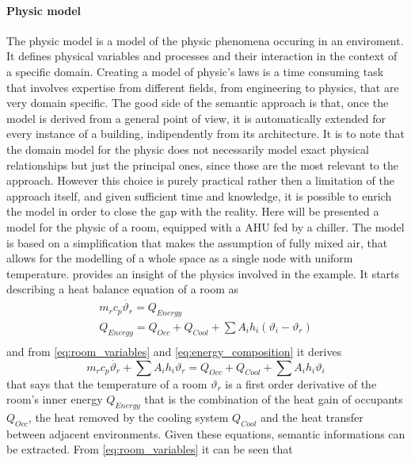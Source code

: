 \paragraph{Physic model}
The physic model is a model of the physic phenomena occuring in an enviroment. It defines physical variables and processes and their interaction in the context of a specific domain. Creating a model of physic's laws is a time consuming task that involves expertise from different fields, from engineering to physics, that are very domain specific. The good side of the semantic approach is that, once the model is derived from a general point of view, it is automatically extended for every instance of a building, indipendently from its architecture. It is to note that the domain model for the physic does not necessarily model exact physical relationships but just the principal ones, since those are the most relevant to the approach. However this choice is purely practical rather then a limitation of the approach itself, and given sufficient time and knowledge, it is possible to enrich the model in order to close the gap with the reality. Here will be presented a model for the physic of a room, equipped with a AHU fed by a chiller. The model is based on a simplification that makes the assumption of fully mixed air, that allows for the modelling of a whole space as a single node with uniform temperature. \textcite{building_room_physics} provides an insight of the physics involved in the example. It starts describing a heat balance equation of a room as
\begin{gather}
  m_rc_p\dot{\vartheta_{r}}=Q_{Energy}\label{eq:room_variables}\\
  Q_{Energy}=Q_{Occ}+Q_{Cool}+\sum{A_ih_i(\vartheta_{i}-\vartheta_{r})}\label{eq:energy_composition}\\
\end{gather}
and from \autoref{eq:room_variables} and \autoref{eq:energy_composition} it derives
\begin{equation}
  m_rc_p\dot{\vartheta_{r}}+\sum{A_ih_i\vartheta_{r}}=Q_{Occ}+Q_{Cool}+\sum{A_ih_i\vartheta_{i}} \label{eq:room_lag}
\end{equation}
that says that the temperature of a room $\vartheta_r$ is a first order derivative of the room's inner energy $Q_{Energy}$ that is the combination of the heat gain of occupants $Q_{Occ}$, the heat removed by the cooling system $Q_{Cool}$ and the heat transfer between adjacent environments. Given these equations, semantic informations can be extracted.
From \autoref{eq:room_variables} it can be seen that
